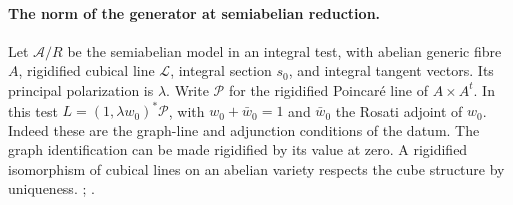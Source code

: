\paragraph{The norm of the generator at semiabelian reduction.}
Let \(\mathcal A/R\) be the semiabelian model in an integral test,
with abelian generic fibre \(A\), rigidified cubical line
\(\mathcal L\), integral section \(s_0\), and integral tangent
vectors. Its principal polarization is \(\lambda\). Write
\(\mathcal P\) for the rigidified Poincaré line of \(A\times A^t\).
In this test \(L=(1,\lambda w_0)^*\mathcal P\), with
\(w_0+\bar w_0=1\) and \(\bar w_0\) the Rosati adjoint of \(w_0\).
Indeed these are the graph-line and adjunction conditions of the
datum. The graph identification can be made rigidified by its value
at zero. A rigidified isomorphism of cubical lines on an abelian
variety respects the cube structure by uniqueness.
;
.

